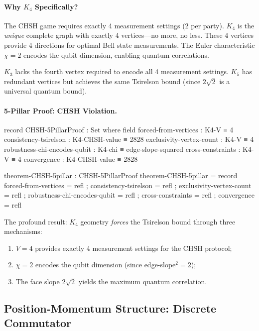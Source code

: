 \documentclass[11pt,a4paper]{book}
\begin{document}
\paragraph{Why $K_4$ Specifically?}
The CHSH game requires exactly 4 measurement settings (2 per party).
$K_4$ is the \emph{unique} complete graph with exactly 4 vertices---no more, no less.
These 4 vertices provide 4 directions for optimal Bell state measurements.
The Euler characteristic $\chi = 2$ encodes the qubit dimension, enabling quantum correlations.

$K_3$ lacks the fourth vertex required to encode all 4 measurement settings.
$K_5$ has redundant vertices but achieves the same Tsirelson bound (since $2\sqrt{2}$ is a universal quantum bound).

\paragraph{5-Pillar Proof: CHSH Violation.}

\begin{code}
record CHSH-5PillarProof : Set where
  field
    forced-from-vertices : K4-V ≡ 4
    consistency-tsirelson : K4-CHSH-value ≡ 2828
    exclusivity-vertex-count : K4-V ≡ 4
    robustness-chi-encodes-qubit : K4-chi ≡ edge-slope-squared
    cross-constraints : K4-V ≡ 4
    convergence : K4-CHSH-value ≡ 2828

theorem-CHSH-5pillar : CHSH-5PillarProof
theorem-CHSH-5pillar = record
  { forced-from-vertices = refl
  ; consistency-tsirelson = refl
  ; exclusivity-vertex-count = refl
  ; robustness-chi-encodes-qubit = refl
  ; cross-constraints = refl
  ; convergence = refl
  }
\end{code}

The profound result: $K_4$ geometry \emph{forces} the Tsirelson bound through three mechanisms:
\begin{enumerate}
\item $V = 4$ provides exactly 4 measurement settings for the CHSH protocol;
\item $\chi = 2$ encodes the qubit dimension (since edge-slope$^2 = 2$);
\item The face slope $2\sqrt{2}$ yields the maximum quantum correlation.
\end{enumerate}

\subsection{Position-Momentum Structure: Discrete Commutator}
\end{document}
